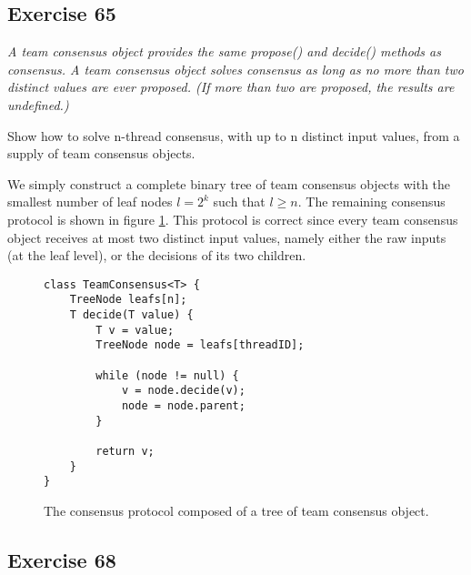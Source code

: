 \documentclass[a4paper,10pt]{article}
\begin{document}
\subsection{Exercise 65}

{\itshape
A team consensus object provides the same propose() and decide()
methods as consensus. A team consensus object solves consensus as long as no
more than two distinct values are ever proposed. (If more than two are proposed,
the results are undefined.)

Show how to solve n-thread consensus, with up to n distinct input values, from
a supply of team consensus objects.}

\vspace{3mm}

We simply construct a complete binary tree of team consensus objects with the smallest number
of leaf nodes $l = 2^k$ such that $l \geq n$. The remaining consensus protocol is shown in figure \ref{fig:teamconsensus}. This protocol is correct since every team consensus object receives
at most two distinct input values, namely either the raw inputs (at the leaf level), or the
decisions of its two children.

\begin{figure}
\begin{lstlisting}
class TeamConsensus<T> {
    TreeNode leafs[n];
    T decide(T value) {
        T v = value;
        TreeNode node = leafs[threadID];

        while (node != null) {
            v = node.decide(v);
            node = node.parent;
        }

        return v;
    }
}
\end{lstlisting}
\caption{The consensus protocol composed of a tree of team consensus object.}
\label{fig:teamconsensus}
\end{figure}

\subsection{Exercise 68}
\end{document}
